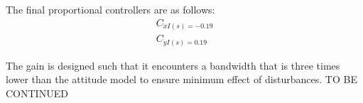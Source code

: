 The final proportional controllers are as follows:
\begin{align}
C_{\dot{x}I(s)= -0.19}\\
C_{\dot{y}I(s)= 0.19}
\end{align}
\begin{where}
\end{where}
The gain is designed such that it encounters a bandwidth that is three times lower than the attitude model to ensure minimum effect of disturbances. TO BE CONTINUED 